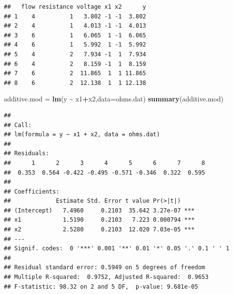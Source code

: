 \documentclass[
]{article}
\newenvironment{Shaded}{\begin{snugshade}}{\end{snugshade}}
\newcommand{\AttributeTok}[1]{\textcolor[rgb]{0.13,0.29,0.53}{#1}}
\newcommand{\FunctionTok}[1]{\textcolor[rgb]{0.13,0.29,0.53}{\textbf{#1}}}
\newcommand{\NormalTok}[1]{#1}
\newcommand{\OtherTok}[1]{\textcolor[rgb]{0.56,0.35,0.01}{#1}}
\newcommand{\SpecialCharTok}[1]{\textcolor[rgb]{0.81,0.36,0.00}{\textbf{#1}}}
\newcommand{\StringTok}[1]{\textcolor[rgb]{0.31,0.60,0.02}{#1}}
\begin{document}
\begin{verbatim}
##   flow resistance voltage x1 x2      y
## 1    4          1   3.802 -1 -1  3.802
## 2    4          1   4.013 -1 -1  4.013
## 3    6          1   6.065  1 -1  6.065
## 4    6          1   5.992  1 -1  5.992
## 5    4          2   7.934 -1  1  7.934
## 6    4          2   8.159 -1  1  8.159
## 7    6          2  11.865  1  1 11.865
## 8    6          2  12.138  1  1 12.138
\end{verbatim}

\begin{Shaded}
\begin{Highlighting}[]
\NormalTok{additive.mod }\OtherTok{=} \FunctionTok{lm}\NormalTok{(y }\SpecialCharTok{\textasciitilde{}}\NormalTok{ x1}\SpecialCharTok{+}\NormalTok{x2,}\AttributeTok{data=}\NormalTok{ohms.dat)}
\FunctionTok{summary}\NormalTok{(additive.mod)}
\end{Highlighting}
\end{Shaded}

\begin{verbatim}
## 
## Call:
## lm(formula = y ~ x1 + x2, data = ohms.dat)
## 
## Residuals:
##      1      2      3      4      5      6      7      8 
##  0.353  0.564 -0.422 -0.495 -0.571 -0.346  0.322  0.595 
## 
## Coefficients:
##             Estimate Std. Error t value Pr(>|t|)    
## (Intercept)   7.4960     0.2103  35.642 3.27e-07 ***
## x1            1.5190     0.2103   7.223 0.000794 ***
## x2            2.5280     0.2103  12.020 7.03e-05 ***
## ---
## Signif. codes:  0 '***' 0.001 '**' 0.01 '*' 0.05 '.' 0.1 ' ' 1
## 
## Residual standard error: 0.5949 on 5 degrees of freedom
## Multiple R-squared:  0.9752, Adjusted R-squared:  0.9653 
## F-statistic: 98.32 on 2 and 5 DF,  p-value: 9.681e-05
\end{verbatim}

\begin{Shaded}
\end{Shaded}
\end{document}
